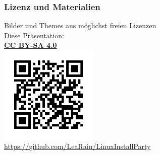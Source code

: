 \documentclass[9pt]{beamer}
\begin{document}
\begin{frame}
 \centering
 \frametitle{Lizenz und Materialien}
 \justifying
 \centering
 Bilder und Themes aus möglichst freien Lizenzen\\
 Diese Präsentation:\\
 \centering
 \textbf{\href{https://creativecommons.org/licenses/by-sa/4.0/}{CC BY-SA 4.0}}\\
 \includegraphics[width=0.35\textwidth]{assets/qr.png}\\
 \href{https://github.com/LeaRain/LinuxInstallParty}{https://github.com/LeaRain/LinuxInstallParty}
\end{frame}
\end{document}
